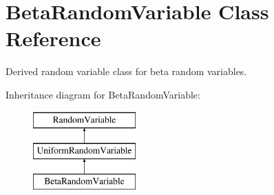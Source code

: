 \section{Beta\+Random\+Variable Class Reference}
\label{classPecos_1_1BetaRandomVariable}


Derived random variable class for beta random variables.  


Inheritance diagram for Beta\+Random\+Variable\+:\begin{figure}[H]
\begin{center}
\leavevmode
\includegraphics[height=3.000000cm]{classPecos_1_1BetaRandomVariable}
\end{center}
\end{figure}
